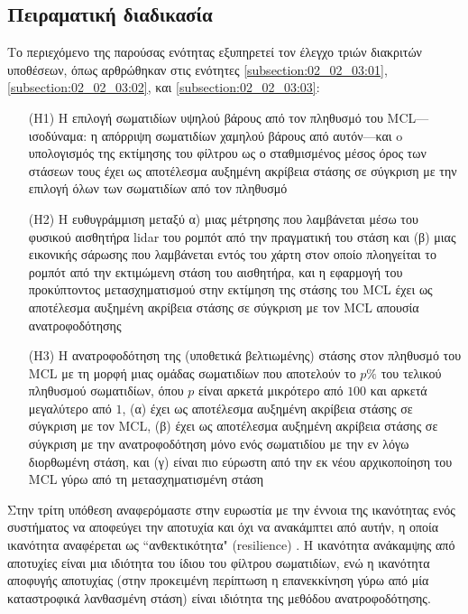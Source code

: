 \subsection{Πειραματική διαδικασία}
\label{subsection:02_02_04:01}

Το περιεχόμενο της παρούσας ενότητας εξυπηρετεί τον έλεγχο τριών διακριτών
υποθέσεων, όπως αρθρώθηκαν στις ενότητες \ref{subsection:02_02_03:01},
\ref{subsection:02_02_03:02}, και \ref{subsection:02_02_03:03}:

\begin{enumerate}
  \item[(H1)] Η επιλογή σωματιδίων υψηλού βάρους από τον πληθυσμό του
        MCL---ισοδύναμα: η απόρριψη σωματιδίων χαμηλού βάρους από αυτόν---και o
        υπολογισμός της εκτίμησης του φίλτρου ως ο σταθμισμένος μέσος όρος
        των στάσεων τους έχει ως αποτέλεσμα αυξημένη ακρίβεια στάσης σε σύγκριση
        με την επιλογή όλων των σωματιδίων από τον πληθυσμό
  \item[(H2)] Η ευθυγράμμιση μεταξύ α) μιας μέτρησης που λαμβάνεται μέσω του
        φυσικού αισθητήρα lidar του ρομπότ από την πραγματική του στάση και
        (β) μιας εικονικής σάρωσης που λαμβάνεται εντός του χάρτη στον οποίο
        πλοηγείται το ρομπότ από την εκτιμώμενη στάση του αισθητήρα, και η
        εφαρμογή του προκύπτοντος μετασχηματισμού στην εκτίμηση της στάσης του
        MCL έχει ως αποτέλεσμα αυξημένη ακρίβεια στάσης σε σύγκριση με τον MCL
        απουσία ανατροφοδότησης
  \item[(H3)] Η ανατροφοδότηση της (υποθετικά βελτιωμένης) στάσης στον πληθυσμό
        του MCL με τη μορφή μιας ομάδας σωματιδίων που αποτελούν το $p\%$ του
        τελικού πληθυσμού σωματιδίων, όπου $p$ είναι αρκετά μικρότερο από $100$
        και αρκετά μεγαλύτερο από $1$, (α) έχει ως αποτέλεσμα αυξημένη ακρίβεια
        στάσης σε σύγκριση με τον MCL, (β) έχει ως αποτέλεσμα αυξημένη ακρίβεια
        στάσης σε σύγκριση με την ανατροφοδότηση μόνο ενός σωματιδίου με την εν
        λόγω διορθωμένη στάση, και (γ) είναι πιο εύρωστη από την εκ νέου
        αρχικοποίηση του MCL γύρω από τη μετασχηματισμένη στάση
\end{enumerate}

Στην τρίτη υπόθεση αναφερόμαστε στην ευρωστία με την έννοια της ικανότητας ενός
συστήματος να αποφεύγει την αποτυχία και όχι να ανακάμπτει από αυτήν, η οποία
ικανότητα αναφέρεται ως ``ανθεκτικότητα" (resilience)
\cite{Zhu2011b,Tavana2011}. Η ικανότητα ανάκαμψης από αποτυχίες είναι μια
ιδιότητα του ίδιου του φίλτρου σωματιδίων, ενώ η ικανότητα αποφυγής αποτυχίας
(στην προκειμένη περίπτωση η επανεκκίνηση γύρω από μία καταστροφικά λανθασμένη
στάση) είναι ιδιότητα της μεθόδου ανατροφοδότησης.

